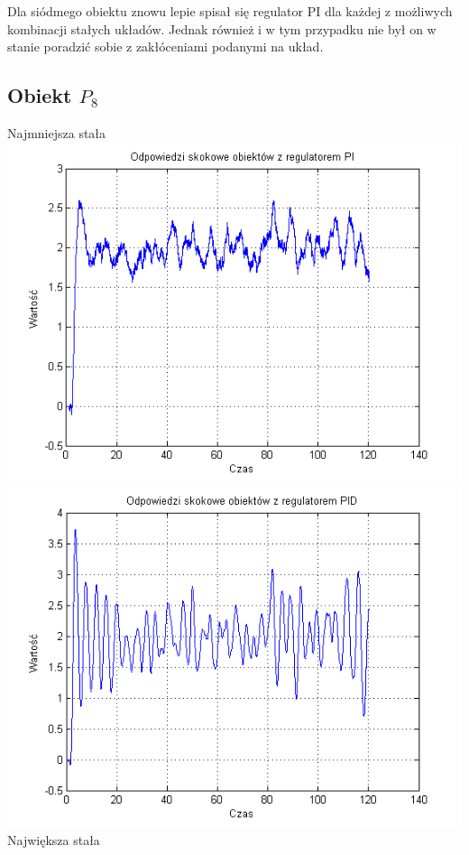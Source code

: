 \documentclass[10pt,a4paper]{article}
\begin{document}
Dla siódmego obiektu znowu lepie spisał się regulator PI dla  każdej z możliwych kombinacji stałych układów. Jednak również i w tym przypadku nie był on w stanie poradzić sobie z zakłóceniami podanymi na układ.
\newpage
\subsection*{Obiekt $P_8$}
Najmniejsza stała\\
\includegraphics[scale=1]{images/trzy/skrypt_17.png}\\
\includegraphics[scale=1]{images/cztery/skrypt_17.png}\\
Największa stała\\
\end{document}
